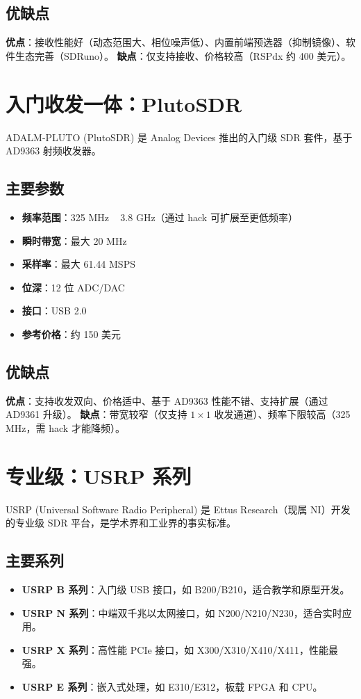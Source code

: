 \documentclass[12pt,UTF8]{ctexbook}
\begin{document}
\subsection{优缺点}
\textbf{优点}：接收性能好（动态范围大、相位噪声低）、内置前端预选器（抑制镜像）、软件生态完善（SDRuno）。
\textbf{缺点}：仅支持接收、价格较高（RSPdx 约 400 美元）。

\section{入门收发一体：PlutoSDR}
\label{sec:plutosdr_detail}

ADALM-PLUTO (PlutoSDR) 是 Analog Devices 推出的入门级 SDR 套件，基于 AD9363 射频收发器。

\subsection{主要参数}
\begin{itemize}[leftmargin=2cm]
    \item \textbf{频率范围}：325 MHz ~ 3.8 GHz（通过 hack 可扩展至更低频率）
    \item \textbf{瞬时带宽}：最大 20 MHz
    \item \textbf{采样率}：最大 61.44 MSPS
    \item \textbf{位深}：12 位 ADC/DAC
    \item \textbf{接口}：USB 2.0
    \item \textbf{参考价格}：约 150 美元
\end{itemize}

\subsection{优缺点}
\textbf{优点}：支持收发双向、价格适中、基于 AD9363 性能不错、支持扩展（通过 AD9361 升级）。
\textbf{缺点}：带宽较窄（仅支持 $1\times1$ 收发通道）、频率下限较高（325 MHz，需 hack 才能降频）。

\section{专业级：USRP 系列}
\label{sec:usrp_detail}

USRP (Universal Software Radio Peripheral) 是 Ettus Research（现属 NI）开发的专业级 SDR 平台，是学术界和工业界的事实标准。

\subsection{主要系列}
\begin{itemize}[leftmargin=2cm]
    \item \textbf{USRP B 系列}：入门级 USB 接口，如 B200/B210，适合教学和原型开发。
    \item \textbf{USRP N 系列}：中端双千兆以太网接口，如 N200/N210/N230，适合实时应用。
    \item \textbf{USRP X 系列}：高性能 PCIe 接口，如 X300/X310/X410/X411，性能最强。
    \item \textbf{USRP E 系列}：嵌入式处理，如 E310/E312，板载 FPGA 和 CPU。
\end{itemize}
\end{document}
